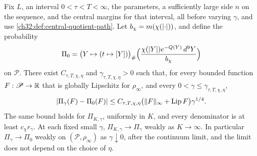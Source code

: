 \begin{theorem}\label{ch32:thm:central-quotient-path}
Fix $L$, an interval $0<\tau<T<\infty$, the parameters, a sufficiently large side $n$ on the sequence, and the central margins for that interval, all before varying $\gamma$, and use \cref{ch32:def:central-quotient-path}. Let $b_\chi=m(\chi(\lvert \cdot\rvert))$, and define the probability
\[
 \Pi_0=\bigl(Y\mapsto(t\mapsto[Y])\bigr)_\#\Bigl(\frac{\chi(\lvert Y\rvert)e^{-Q(Y)}\,d^9Y}{b_\chi}\Bigr)
\]
on $\mathscr P$. There exist $C_{\tau,T,\chi,\eta}$ and $\gamma_{\tau,T,\chi,\eta}>0$ such that, for every bounded function $F:\mathscr P\to\mathbb R$ that is globally Lipschitz for $\rho_\infty$, and every $0<\gamma\le\gamma_{\tau,T,\chi,\eta}$,
\[
 \lvert \Pi_\gamma(F)-\Pi_0(F)\rvert\le C_{\tau,T,\chi,\eta}\bigl(\lVert F\rVert_\infty+\operatorname{Lip} F\bigr)\gamma^{1/4}.
\]
The same bound holds for $\Pi_{K,\gamma}$, uniformly in $K$, and every denominator is at least $c_\chi r_\gamma$. At each fixed small $\gamma$, $\Pi_{K,\gamma}\to\Pi_\gamma$ weakly as $K\to\infty$. In particular $\Pi_\gamma\to\Pi_0$ weakly on $(\mathscr P,\rho_\infty)$ as $\gamma\downarrow0$, after the continuum limit, and the limit does not depend on the choice of $\eta$.
\end{theorem}

